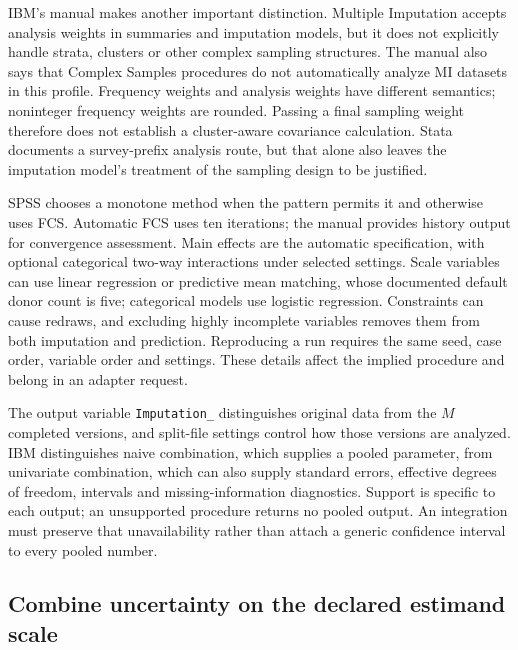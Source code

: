 IBM's manual makes another important distinction. Multiple Imputation accepts
analysis weights in summaries and imputation models, but it does not explicitly
handle strata, clusters or other complex sampling structures. The manual also
says that Complex Samples procedures do not automatically analyze MI datasets
in this profile. Frequency weights and analysis weights have different
semantics; noninteger frequency weights are rounded. Passing a final sampling
weight therefore does not establish a cluster-aware covariance calculation.
Stata documents a survey-prefix analysis route, but that alone also leaves
the imputation model's treatment of the sampling design to be justified.
\citep{exec21_transport_spss_missing,exec21_transport_stata_estimate}

SPSS chooses a monotone method when the pattern permits it and otherwise uses
FCS. Automatic FCS uses ten iterations; the manual provides history output
for convergence assessment. Main effects are the automatic specification,
with optional categorical two-way interactions under selected settings.
Scale variables can use linear regression or predictive mean matching, whose
documented default donor count is five; categorical models use logistic
regression. Constraints can cause redraws, and excluding highly incomplete
variables removes them from both imputation and prediction. Reproducing a run
requires the same seed, case order, variable order and settings. These details
affect the implied procedure and belong in an adapter request.
\citep{exec21_transport_spss_missing}

The output variable \texttt{Imputation\_} distinguishes original data from
the $M$ completed versions, and split-file settings control how those versions
are analyzed. IBM distinguishes naive combination, which supplies a pooled
parameter, from univariate combination, which can also supply standard errors,
effective degrees of freedom, intervals and missing-information diagnostics.
Support is specific to each output; an unsupported procedure returns no pooled
output. An integration must preserve that unavailability rather than attach a
generic confidence interval to every pooled number.
\citep{exec21_transport_spss_missing}

\subsection{Combine uncertainty on the declared estimand scale}
\label{exec21:transport-pooling}

